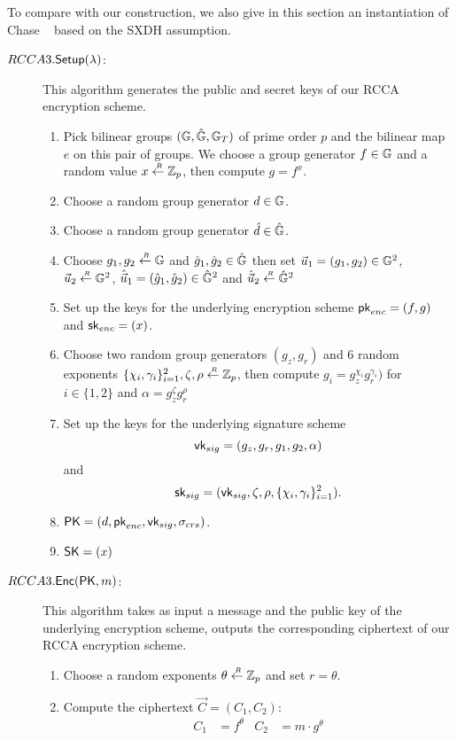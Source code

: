 To compare with our construction, we also give in this section an instantiation of Chase \etal~\cite{DBLP:conf/eurocrypt/ChaseKLM12} based on the SXDH assumption.

\begin{description}
\item[\boldmath$RCCA3.{\mathsf{Setup}}(\lambda)$:] This algorithm generates the public and secret keys of our RCCA encryption scheme.
  \begin{enumerate}
  \item Pick bilinear groups $(\mathbb{G}, \hat{\mathbb{G}}, \mathbb{G}_T)$ of prime order $p$ and the bilinear map $e$ on this pair of groups. We choose a group generator $f \in \mathbb{G}$ and a random value $x \stackrel{{\scriptscriptstyle \mkern4mu R}}{\gets} \mathbb{Z}_p$, then compute $g = f^x$.
  \item Choose a random group generator $d \in \mathbb{G}$.
  \item Choose a random group generator $\hat{d} \in \hat{\mathbb{G}}$.
  \item Choose $g_1,g_2 \stackrel{{\scriptscriptstyle \mkern4mu R}}{\gets} \mathbb{G}$ and $\hat{g}_1, \hat{g}_2 \in \hat{\mathbb{G}}$ then set $\vec{u}_1 = (g_1, g_2) \in \mathbb{G}^2$, $\vec{u}_2 \stackrel{{\scriptscriptstyle \mkern4mu R}}{\gets} \mathbb{G}^2$, $\hat{\vec{u}}_1 = (\hat{g}_1, \hat{g}_2) \in \hat{\mathbb{G}}^2$ and $\hat{\vec{u}}_2 \stackrel{{\scriptscriptstyle \mkern4mu R}}{\gets} \hat{\mathbb{G}}^2 $
  \item Set up the keys for the underlying encryption scheme $\mathsf{pk}_{enc} = (f,g)$ and $\mathsf{sk}_{enc} = (x)$.
  \item Choose two random group generators $(g_z, g_r)$ and $6$ random exponents $\{\chi_i, \gamma_i\}_{i = 1}^2, \zeta, \rho\stackrel{{\scriptscriptstyle \mkern4mu R}}{\gets} \mathbb{Z}_p$, then compute $g_i = g_z^{\chi_i}g_r^{\gamma_i})$ for $ i \in \{1,2\}$ and $\alpha = g_z^\zeta g_r^\rho$
  \item Set up the keys for the underlying signature scheme
    $$\mathsf{vk}_{sig} = (g_z, g_r, g_1, g_2, \alpha)$$
    and
    $$\mathsf{sk}_{sig} = (\mathsf{vk}_{sig}, \zeta, \rho, \{\chi_i, \gamma_i\}_{i = 1}^2).$$
  \item $\mathsf{PK} = (d,\mathsf{pk}_{enc}, \mathsf{vk}_{sig}, \sigma_{crs})$.
  \item $\mathsf{SK} = (x)$
  \end{enumerate}

\item[\boldmath$RCCA3.{\mathsf{Enc}}(\mathsf{PK},m)$:] This algorithm takes as input a message and the public key of the underlying encryption scheme, outputs the corresponding ciphertext of our RCCA encryption scheme.
  \begin{enumerate}
  \item Choose a random exponents $\theta \stackrel{{\scriptscriptstyle \mkern4mu R}}{\gets} \mathbb{Z}_p$ and set $r = \theta$.
  \item Compute the ciphertext $\vec{C} = (C_1, C_2)$:
    \begin{align*}
      C_1 &= f^{\theta} & C_2 &= m \cdot g^{\theta}
    \end{align*}


\end{enumerate}
\end{description}
